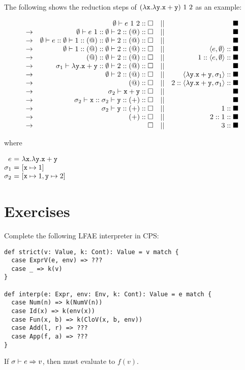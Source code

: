 The following shows the reduction steps of
$(\lambda\texttt{x}.\lambda\texttt{y}.\texttt{x}+\texttt{y})\ 1\ 2$ as an example:

\[
\begin{array}{lrcr}
              & \emptyset\vdash e\ 1\ 2:: \square &||& \blacksquare \\
  \rightarrow & \emptyset\vdash e\ 1:: \emptyset\vdash2:: (@):: \square &||& \blacksquare \\
  \rightarrow & \emptyset\vdash e:: \emptyset\vdash1:: (@):: \emptyset\vdash2:: (@):: \square &||& \blacksquare \\
  \rightarrow & \emptyset\vdash1:: (@):: \emptyset\vdash2:: (@):: \square &||& \langle e,\emptyset\rangle::\blacksquare \\
  \rightarrow & (@):: \emptyset\vdash2:: (@):: \square &||& 1::\langle e,\emptyset\rangle::\blacksquare \\
  \rightarrow & \sigma_1\vdash\lambda \texttt{y}.\texttt{x}+\texttt{y}:: \emptyset\vdash2:: (@):: \square &||& \blacksquare \\
  \rightarrow & \emptyset\vdash2:: (@):: \square &||& \langle\lambda\texttt{y}.\texttt{x}+\texttt{y},\sigma_1\rangle::\blacksquare \\
  \rightarrow & (@):: \square &||& 2::\langle\lambda\texttt{y}.\texttt{x}+\texttt{y},\sigma_1\rangle::\blacksquare \\
  \rightarrow & \sigma_2\vdash\texttt{x}+\texttt{y}:: \square &||& \blacksquare \\
  \rightarrow & \sigma_2\vdash\texttt{x}:: \sigma_2\vdash\texttt{y}:: (+):: \square &||& \blacksquare \\
  \rightarrow & \sigma_2\vdash\texttt{y}:: (+):: \square &||& 1::\blacksquare \\
  \rightarrow & (+):: \square &||& 2::1::\blacksquare \\
  \rightarrow & \square &||& 3::\blacksquare \\
\end{array}
\]

where

$
\begin{array}{@{}r@{~}c@{~}l}
  e&=&\efun{\cx}{\efun{\cy}{\cx+\cy}}\\
  \sigma_1&=&[\cx\mapsto1]\\
  \sigma_2&=&[\cx\mapsto1,\cy\mapsto2]\\
\end{array}
$

\section{Exercises}

\begin{exercise}

Complete the following \textsf{LFAE} interpreter in CPS:

\begin{verbatim}
def strict(v: Value, k: Cont): Value = v match {
  case ExprV(e, env) => ???
  case _ => k(v)
}

def interp(e: Expr, env: Env, k: Cont): Value = e match {
  case Num(n) => k(NumV(n))
  case Id(x) => k(env(x))
  case Fun(x, b) => k(CloV(x, b, env))
  case Add(l, r) => ???
  case App(f, a) => ???
}
\end{verbatim}

If $\sigma\vdash e\Rightarrow v$, then  must evaluate to $f(v)$.

\end{exercise}
